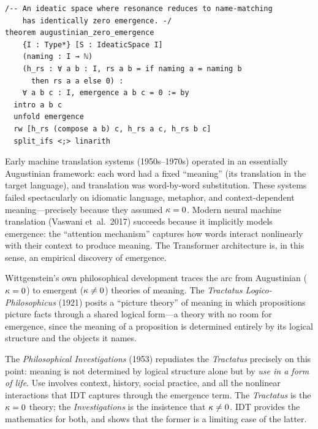 \begin{lstlisting}[caption={Lean 4: Augustinian ideatic space has zero emergence}]
/-- An ideatic space where resonance reduces to name-matching
    has identically zero emergence. -/
theorem augustinian_zero_emergence
    {I : Type*} [S : IdeaticSpace I]
    (naming : I → ℕ)
    (h_rs : ∀ a b : I, rs a b = if naming a = naming b
      then rs a a else 0) :
    ∀ a b c : I, emergence a b c = 0 := by
  intro a b c
  unfold emergence
  rw [h_rs (compose a b) c, h_rs a c, h_rs b c]
  split_ifs <;> linarith
\end{lstlisting}

\begin{example}
Early machine translation systems (1950s--1970s) operated in an essentially
Augustinian framework: each word had a fixed ``meaning'' (its translation
in the target language), and translation was word-by-word substitution.
These systems failed spectacularly on idiomatic language, metaphor, and
context-dependent meaning---precisely because they assumed $\kappa = 0$.
Modern neural machine translation (Vaswani et~al.\ 2017) succeeds because
it implicitly models emergence: the ``attention mechanism'' captures how
words interact nonlinearly with their context to produce meaning. The
Transformer architecture is, in this sense, an empirical discovery of
emergence.
\end{example}

\begin{remark}
Wittgenstein's own philosophical development traces the arc from
Augustinian ($\kappa = 0$) to emergent ($\kappa \neq 0$) theories
of meaning. The \emph{Tractatus Logico-Philosophicus} (1921) posits a
``picture theory'' of meaning in which propositions picture facts
through a shared logical form---a theory with no room for emergence,
since the meaning of a proposition is determined entirely by its
logical structure and the objects it names.

The \emph{Philosophical Investigations} (1953) repudiates the
\emph{Tractatus} precisely on this point: meaning is not determined
by logical structure alone but by \emph{use in a form of life}. Use
involves context, history, social practice, and all the nonlinear
interactions that IDT captures through the emergence term. The
\emph{Tractatus} is the $\kappa = 0$ theory; the \emph{Investigations}
is the insistence that $\kappa \neq 0$. IDT provides the mathematics
for both, and shows that the former is a limiting case of the latter.
\end{remark}


